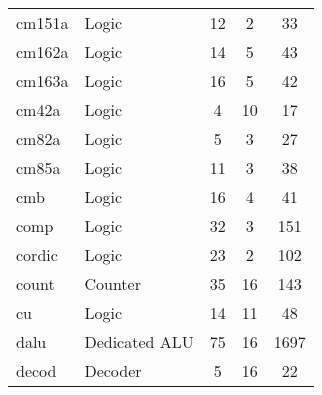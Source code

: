 {\begin{pespace}
\begin{center}
\begin{tabular}{|l|l|c|c|c|}
cm151a  & Logic            & 12     & 2       &    33 \\
cm162a  & Logic            & 14     & 5       &    43 \\
cm163a  & Logic            & 16     & 5       &    42 \\
cm42a   & Logic            & 4      & 10      &    17 \\
cm82a   & Logic            & 5      & 3       &    27 \\
cm85a   & Logic            & 11     & 3       &    38 \\
cmb     & Logic            & 16     & 4       &    41 \\
comp    & Logic            & 32     & 3       &   151 \\
cordic  & Logic            & 23     & 2       &   102 \\
count   & Counter          & 35     & 16      &   143 \\
cu      & Logic            & 14     & 11      &    48 \\
dalu    & Dedicated ALU    & 75     & 16      &  1697 \\
decod   & Decoder          & 5      & 16      &    22 \\
\hline
\end{tabular}
\end{center}


\begin{center}
\begin{tabular}{|l|l|c|c|c|} \hline


\end{tabular}
\end{center}
\end{pespace}}
